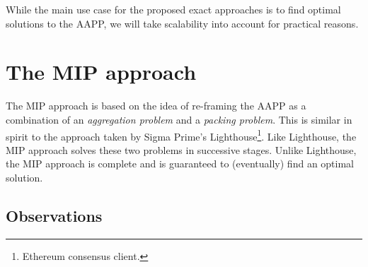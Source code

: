 \documentclass{article}
\begin{document}
While the main use case for the proposed exact approaches is to find optimal
solutions to the AAPP, we will take scalability into account for practical
reasons.

\section{The MIP approach} \label{sec:mip}

The MIP approach is based on the idea of re-framing the AAPP as a combination
of an \emph{aggregation problem} and a \emph{packing problem}. This is similar
in spirit to the approach taken by Sigma Prime's Lighthouse\footnote{Ethereum
consensus client.}. Like Lighthouse, the MIP approach solves these two problems
in successive stages. Unlike Lighthouse, the MIP approach is complete and is
guaranteed to (eventually) find an optimal solution.

 
\subsection{Observations}
\end{document}
